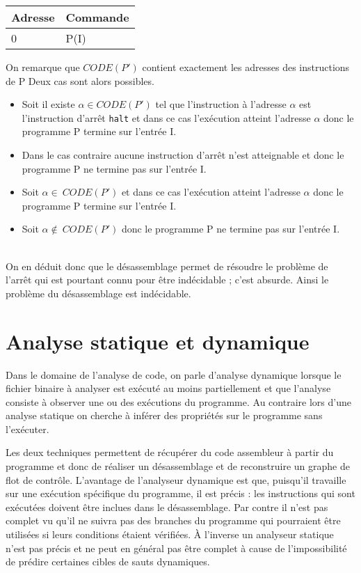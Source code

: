 \begin{center}
\begin{tabular}{|l|l|}
\hline
Adresse & Commande \\
\hline
0 & P(I)\\
\hline
\end{tabular}
\end{center}

On remarque que $CODE(P')$ contient exactement les adresses des instructions de P 
Deux cas sont alors possibles.
\begin{itemize}
 \item Soit il existe $\alpha\in CODE(P')$ tel que l'instruction à l'adresse $\alpha$ est l'instruction d'arrêt \texttt{halt} et dans ce cas l'exécution atteint l'adresse $\alpha$ donc le programme P termine sur l'entrée I.
 \item Dans le cas contraire aucune instruction d'arrêt n'est atteignable et donc le programme P ne termine pas sur l'entrée I.
\end{itemize}
\begin{itemize}
 \item Soit $\alpha\in\ CODE(P')$ et dans ce cas l'exécution atteint l'adresse $\alpha$ donc le programme P termine sur l'entrée I.
 \item Soit $\alpha\notin\ CODE(P')$ donc le programme P ne termine pas sur l'entrée I.
\end{itemize}
~\\
On en déduit donc que le désassemblage permet de résoudre le problème de l'arrêt qui est pourtant connu pour être indécidable ; c'est absurde.
Ainsi le problème du désassemblage est indécidable.

\section{Analyse statique et dynamique}
Dans le domaine de l'analyse de code, on parle d'analyse dynamique lorsque le fichier binaire à analyser est exécuté au moins partiellement et que l'analyse consiste à observer une ou des exécutions du programme. Au contraire lors d'une analyse statique on cherche à inférer des propriétés sur le programme sans l'exécuter.

Les deux techniques permettent de récupérer du code assembleur à partir du programme et donc de réaliser un désassemblage et de reconstruire un graphe de flot de contrôle.
L'avantage de l'analyseur dynamique est que, puisqu'il travaille sur une exécution spécifique du programme, il est précis : les instructions qui sont exécutées doivent être inclues dans le désassemblage.
Par contre il n'est pas complet vu qu'il ne suivra pas des branches du programme qui pourraient être utilisées si leurs conditions étaient vérifiées. À l'inverse un analyseur statique n'est pas précis et ne peut en général pas être complet à cause de l'impossibilité de prédire certaines cibles de sauts dynamiques.